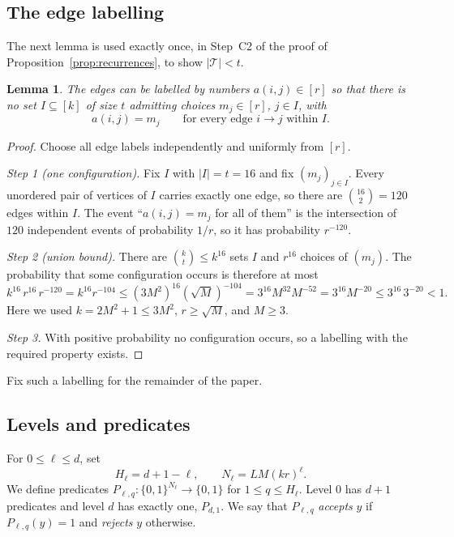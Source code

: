 \documentclass[11pt]{article}
\newtheorem{lemma}[theorem]{Lemma}
\theoremstyle{definition}
\theoremstyle{remark}
\begin{document}
\subsection{The edge labelling}

The next lemma is used exactly once, in Step~C2 of the proof of
Proposition~\ref{prop:recurrences}, to show \(|\mathcal T|<t\).

\begin{lemma}\label{lem:labelling}
The edges can be labelled by numbers \(a(i,j)\in[r]\) so that there is
no set \(I\subseteq[k]\) of size \(t\) admitting choices
\(m_j\in[r]\), \(j\in I\), with
\[
 a(i,j)=m_j \qquad\text{for every edge }i\to j\text{ within }I.
\]
\end{lemma}
\begin{proof}
Choose all edge labels independently and uniformly from \([r]\).

\emph{Step 1 (one configuration).} Fix \(I\) with \(|I|=t=16\) and fix
\((m_j)_{j\in I}\). Every unordered pair of vertices of \(I\) carries exactly
one edge, so there are \(\binom{16}{2}=120\) edges within \(I\). The event
``\(a(i,j)=m_j\) for all of them'' is the intersection of \(120\) independent
events of probability \(1/r\), so it has probability \(r^{-120}\).

\emph{Step 2 (union bound).} There are \(\binom kt\le k^{16}\) sets \(I\) and
\(r^{16}\) choices of \((m_j)\). The probability that some configuration
occurs is therefore at most
\[
 k^{16}\,r^{16}\,r^{-120}=k^{16}r^{-104}
 \le (3M^2)^{16}(\sqrt M)^{-104}
 =3^{16}M^{32}M^{-52}=3^{16}M^{-20}\le 3^{16}\,3^{-20}<1 .
\]
Here we used \(k=2M^2+1\le3M^2\), \(r\ge\sqrt M\), and \(M\ge3\).

\emph{Step 3.} With positive probability no configuration occurs, so a
labelling with the required property exists.
\end{proof}

Fix such a labelling for the remainder of the paper.

\subsection{Levels and predicates}

For \(0\le\ell\le d\), set
\[
 H_\ell=d+1-\ell,\qquad N_\ell=LM(kr)^\ell.
\]
We define predicates \(P_{\ell,q}:\{0,1\}^{N_\ell}\to\{0,1\}\) for
\(1\le q\le H_\ell\). Level \(0\) has \(d+1\) predicates and level \(d\) has
exactly one, \(P_{d,1}\). We say that \(P_{\ell,q}\) \emph{accepts} \(y\) if
\(P_{\ell,q}(y)=1\) and \emph{rejects} \(y\) otherwise.
\end{document}
